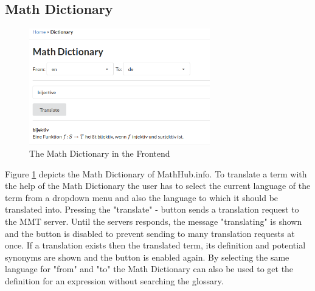 \documentclass[11pt,a4paper]{article}
\begin{document}
\subsection{Math Dictionary}
\begin{figure}[H]
\centerline{\includegraphics[width=0.7\textwidth]{dictionary.png}}
\caption{The Math Dictionary in the Frontend}
\label{fig:dict}
\end{figure}
Figure \ref{fig:dict} depicts the Math Dictionary of MathHub.info.
To translate a term with the help of the Math Dictionary the user has to select the current language of the term from a dropdown menu and also the language to which it should be translated into.
Pressing the "translate" - button sends a translation request to the MMT server.
Until the servers responds, the message "translating" is shown and the button is disabled to prevent sending to many translation requests at once.
If a translation exists then the translated term, its definition and potential synonyms are shown and the button is enabled again.
By selecting the same language for "from" and "to" the Math Dictionary can also be used to get the definition for an expression without searching the glossary.
\end{document}
